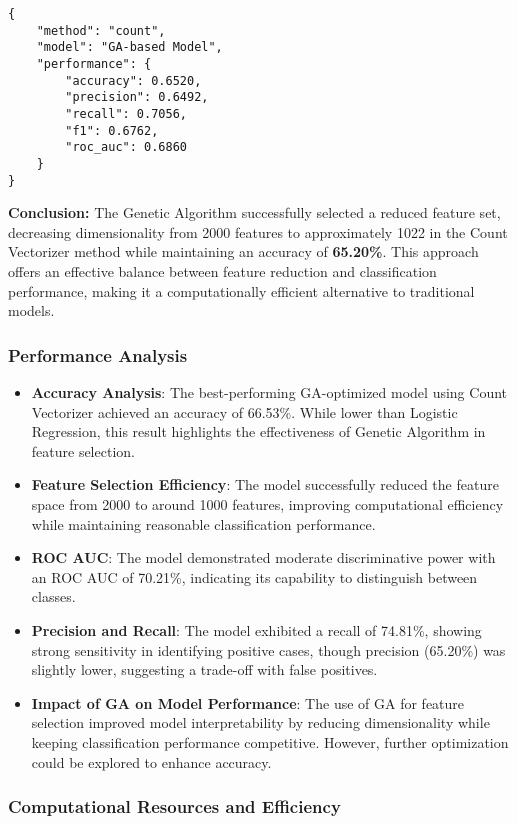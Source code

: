 \begin{verbatim}
{
    "method": "count",
    "model": "GA-based Model",
    "performance": {
        "accuracy": 0.6520,
        "precision": 0.6492,
        "recall": 0.7056,
        "f1": 0.6762,
        "roc_auc": 0.6860
    }
}
\end{verbatim}

\textbf{Conclusion:} The Genetic Algorithm successfully selected a reduced feature set, decreasing dimensionality from 2000 features to approximately 1022 in the Count Vectorizer method while maintaining an accuracy of \textbf{65.20\%}. This approach offers an effective balance between feature reduction and classification performance, making it a computationally efficient alternative to traditional models.

\subsubsection{Performance Analysis}

\begin{itemize}
    \item \textbf{Accuracy Analysis}: The best-performing GA-optimized model using Count Vectorizer achieved an accuracy of 66.53\%. While lower than Logistic Regression, this result highlights the effectiveness of Genetic Algorithm in feature selection.
    \item \textbf{Feature Selection Efficiency}: The model successfully reduced the feature space from 2000 to around 1000 features, improving computational efficiency while maintaining reasonable classification performance.
    \item \textbf{ROC AUC}: The model demonstrated moderate discriminative power with an ROC AUC of 70.21\%, indicating its capability to distinguish between classes.
    \item \textbf{Precision and Recall}: The model exhibited a recall of 74.81\%, showing strong sensitivity in identifying positive cases, though precision (65.20\%) was slightly lower, suggesting a trade-off with false positives.
    \item \textbf{Impact of GA on Model Performance}: The use of GA for feature selection improved model interpretability by reducing dimensionality while keeping classification performance competitive. However, further optimization could be explored to enhance accuracy.
\end{itemize}

\subsubsection{Computational Resources and Efficiency}

